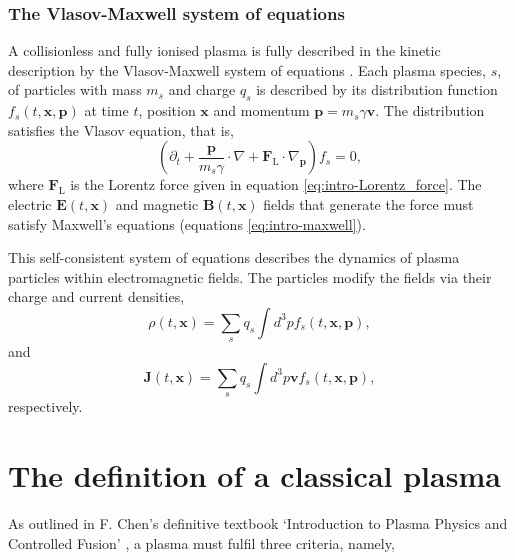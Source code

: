 \subsubsection{The Vlasov-Maxwell system of equations}
A collisionless and fully ionised plasma is fully described in the kinetic description by the Vlasov-Maxwell system of equations \cite{derouillatSmileiCollaborativeOpensource2018}. Each plasma species, $s$, of particles with mass $m_s$ and charge $q_s$ is described by its distribution function $f_s(t,\mathbf{x},\mathbf{p})$ at time $t$, position $\mathbf{x}$ and momentum $\mathbf{p} = m_s \gamma \mathbf{v}$. The distribution satisfies the Vlasov equation, that is,
\begin{equation}\label{eq:intro-vlasov}
	(\partial_t + \frac{\mathbf{p}}{m_s\gamma} \cdot \nabla + \mathbf{F}_\mathrm{L} \cdot \nabla_\mathbf{p})f_s = 0,
\end{equation}
where $\mathbf{F}_\mathrm{L}$ is the Lorentz force given in equation \ref{eq:intro-Lorentz_force}. The electric $\mathbf{E}(t,\mathbf{x})$ and magnetic $\mathbf{B}(t,\mathbf{x})$ fields that generate the force must satisfy Maxwell's equations (equations \ref{eq:intro-maxwell}).

This self-consistent system of equations describes the dynamics of plasma particles within electromagnetic fields. The particles modify the fields via their charge and current densities,
\begin{equation}
	\rho(t,\mathbf{x}) = \sum_s q_s \int d^3pf_s(t,\mathbf{x},\mathbf{p}),
\end{equation}
and 
\begin{equation}
	\mathbf{J}(t,\mathbf{x}) = \sum_s q_s \int d^3p\mathbf{v}f_s(t,\mathbf{x},\mathbf{p}),
\end{equation}
respectively.

\section{\label{sec:plasma_def}The definition of a classical plasma}
As outlined in F. Chen's definitive textbook `Introduction to Plasma Physics and Controlled Fusion' \cite{chenIntroductionPlasmaPhysics2016}, a plasma must fulfil three criteria, namely,

